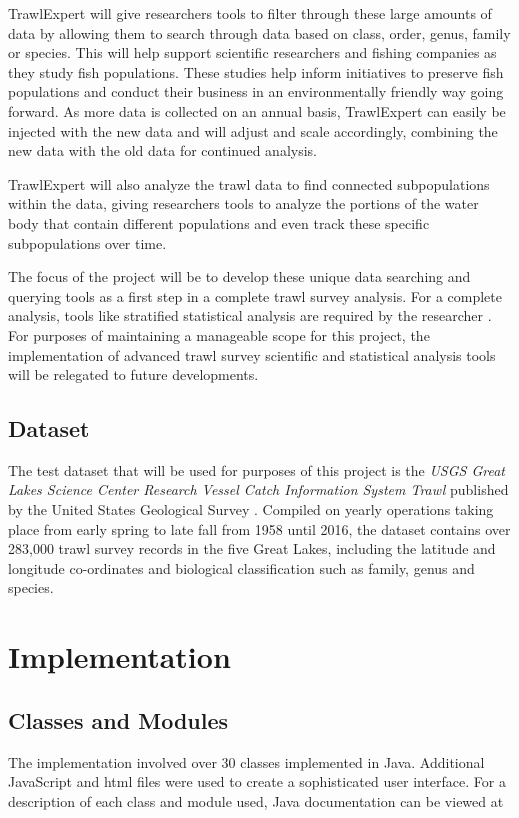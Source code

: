 \documentclass{article}
\begin{document}
TrawlExpert will give researchers tools to filter through these large amounts of data by allowing them to search through data based on class, order, genus, family or species. This will help support scientific researchers and fishing companies as they study fish populations. These studies help inform initiatives to preserve fish populations and conduct their business in an environmentally friendly way going forward. As more data is collected on an annual basis, TrawlExpert can easily be injected with the new data and will adjust and scale accordingly, combining the new data with the old data for continued analysis.

TrawlExpert will also analyze the trawl data to find connected subpopulations within the data, giving researchers tools to analyze the portions of the water body that contain different populations and even track these specific subpopulations over time.

The focus of the project will be to develop these unique data searching and querying tools as a first step in a complete trawl survey analysis. For a complete analysis, tools like stratified statistical analysis are required by the researcher \citep{walsh1997efficiency}. For purposes of maintaining a manageable scope for this project, the implementation of advanced trawl survey scientific and statistical analysis tools will be relegated to future developments. 

\subsection{Dataset}\label{sec:out}
The test dataset that will be used for purposes of this project is the \textit{USGS Great Lakes Science Center Research Vessel Catch Information System Trawl} published by the United States Geological Survey \citep{usgs2018}. Compiled on yearly operations taking place from early spring to late fall from 1958 until 2016, the dataset contains over 283,000 trawl survey records in the five Great Lakes, including the latitude and longitude co-ordinates and biological classification such as family, genus and species.

\section{Implementation}
\subsection{Classes and Modules}
The implementation involved over 30 classes implemented in Java. Additional JavaScript and html files were used to create a sophisticated user interface. For a description of each class and module used, Java documentation can be viewed at %
\end{document}
